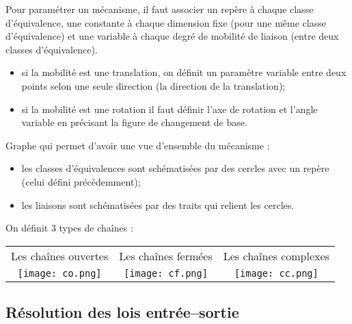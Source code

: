\begin{methode}
Pour paramétrer un mécanisme, il faut associer un repère à chaque classe d'équivalence, une constante à chaque dimension fixe (pour une même classe d'équivalence) et une variable à chaque degré de mobilité de liaison (entre deux classes d'équivalence). 
\begin{itemize}
\item si la mobilité est une translation, on définit un paramètre variable entre deux points selon une seule direction (la direction de la translation);
\item si la mobilité est une rotation il faut définir l'axe de rotation et l'angle variable en précisant la figure de changement de base.
\end{itemize}
\end{methode}

\begin{defi}

Graphe qui permet d'avoir une vue d'ensemble du mécanisme :
\begin{itemize}
\item les classes d'équivalences sont schématisées par des cercles avec un repère (celui défini précédemment);
\item les liaisons sont schématisées par des traits qui relient les cercles.
\end{itemize}

On définit 3 types de chaînes :
\begin{center}
\begin{tabular}{ccc}
Les chaînes ouvertes & Les chaînes fermées & Les chaînes complexes \\
\texttt{[image: co.png]}
&
\texttt{[image: cf.png]}
&
\texttt{[image: cc.png]}\\
\end{tabular}
\end{center}
\end{defi}


\subsection{Résolution des lois entrée--sortie}



